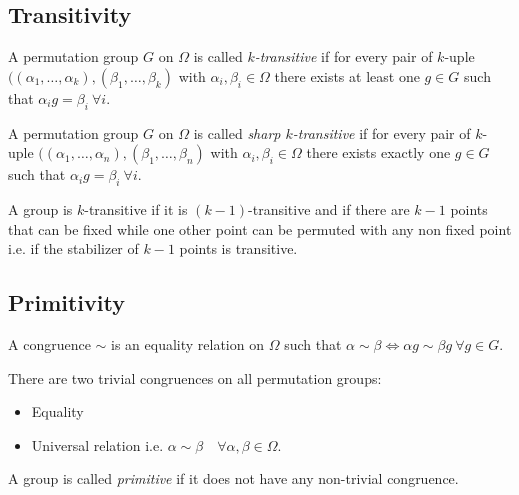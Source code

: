 \subsection{Transitivity}

\begin{definition}
  A permutation group $G$ on $\Omega$ is called \textit{$k$-transitive} if for every pair of $k$-uple $((\alpha_1, \dots, \alpha_k), (\beta_1, \dots, \beta_k)$ with $\alpha_i, \beta_i \in \Omega$ there exists at least one $g \in G$ such that $\alpha_i g = \beta_i \  \forall i$.
\end{definition}

\begin{definition}
  A permutation group $G$ on $\Omega$ is called \textit{sharp $k$-transitive} if for every pair of $k$-uple $((\alpha_1, \dots, \alpha_n), (\beta_1, \dots, \beta_n)$ with $\alpha_i, \beta_i \in \Omega$ there exists exactly one $g \in G$ such that $\alpha_i g = \beta_i \  \forall i$.
\end{definition}

\begin{property}
  \label{practical-transitivity}
  A group is $k$-transitive if it is $(k-1)$-transitive and if there are $k-1$ points that can be fixed while one other point can be permuted with any non fixed point i.e. if the stabilizer of $k-1$ points is transitive.
\end{property}

\subsection{Primitivity}

\begin{definition}[Congruence]
  A congruence $\sim$ is an equality relation on $\Omega$ such that $\alpha \sim \beta \Leftrightarrow \alpha g \sim \beta g \ \forall g \in G$.
\end{definition}

There are two trivial congruences on all permutation groups:
\begin{itemize}
  \item Equality
  \item Universal relation i.e. $\alpha \sim \beta \quad \forall \alpha, \beta \in \Omega$.
\end{itemize}

\begin{definition}
  A group is called \textit{primitive} if it does not have any non-trivial congruence.
\end{definition}

